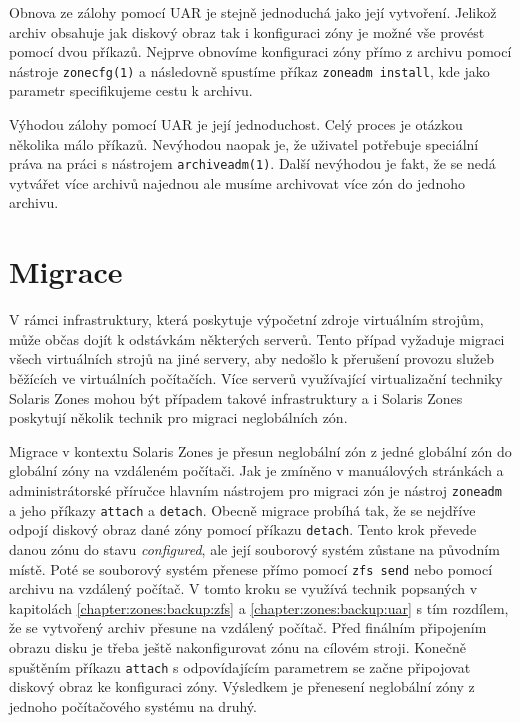Obnova ze zálohy pomocí UAR je stejně jednoduchá jako její vytvoření. Jelikož archiv obsahuje jak diskový obraz tak i konfiguraci
zóny je možné vše provést pomocí dvou příkazů. Nejprve obnovíme konfiguraci zóny přímo z archivu pomocí nástroje \verb|zonecfg(1)|
a následovně spustíme příkaz \verb|zoneadm install|, kde jako parametr specifikujeme cestu k archivu.

Výhodou zálohy pomocí UAR je její jednoduchost. Celý proces je otázkou několika málo příkazů. Nevýhodou naopak je, že uživatel
potřebuje speciální práva na práci s nástrojem \verb|archiveadm(1)|. Další nevýhodou je fakt, že se nedá vytvářet více archivů
najednou ale musíme archivovat více zón do jednoho archivu.
\section{Migrace}
\label{chapter:zones:migration}
V rámci infrastruktury, která poskytuje výpočetní zdroje virtuálním strojům, může občas dojít k odstávkám některých serverů.
Tento případ vyžaduje migraci všech virtuálních strojů na jiné servery, aby nedošlo k přerušení provozu služeb běžících ve 
virtuálních počítačích. Více serverů využívající virtualizační techniky Solaris Zones mohou být případem takové infrastruktury
a i Solaris Zones poskytují několik technik pro migraci neglobálních zón.

Migrace v kontextu Solaris Zones je přesun neglobální zón z jedné globální zón do globální zóny na vzdáleném počítači. Jak je
zmíněno v manuálových stránkách \cite{oracle:manpages:zoneadm} a administrátorské příručce \cite{oracle:solaris:zones:migration}
hlavním nástrojem pro migraci zón je nástroj \verb|zoneadm| a jeho příkazy \verb|attach| a \verb|detach|. Obecně migrace
probíhá tak, že se nejdříve odpojí diskový obraz dané zóny pomocí příkazu \verb|detach|. Tento krok převede danou zónu
do stavu \textit{configured}, ale její souborový systém zůstane na původním místě. Poté se souborový systém přenese přímo pomocí
\verb|zfs send| nebo pomocí archivu na vzdálený počítač. V tomto kroku se využívá technik popsaných v kapitolách 
\ref{chapter:zones:backup:zfs} a \ref{chapter:zones:backup:uar} s tím rozdílem, že se vytvořený archiv přesune na vzdálený
počítač. Před finálním připojením obrazu disku je třeba ještě nakonfigurovat zónu na cílovém stroji. Konečně spuštěním
příkazu \verb|attach| s odpovídajícím parametrem se začne připojovat diskový obraz ke konfiguraci zóny. Výsledkem je  přenesení
neglobální zóny z jednoho počítačového systému na druhý.